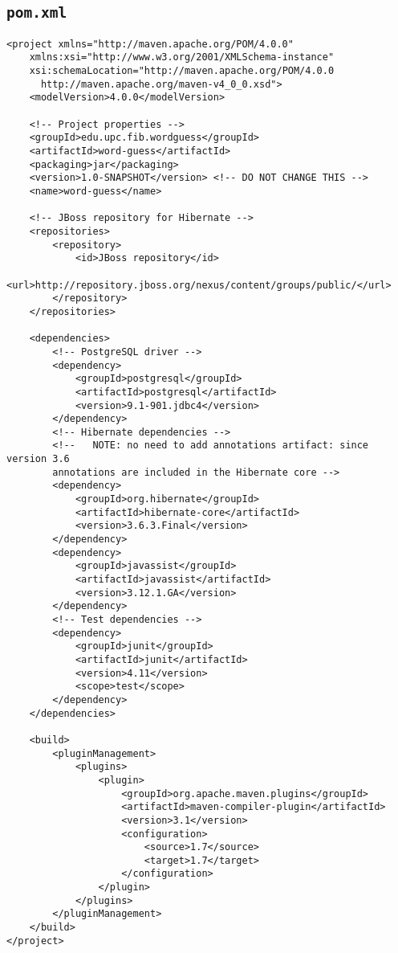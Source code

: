 \subsection{\texttt{pom.xml}}
\begin{verbatim}
<project xmlns="http://maven.apache.org/POM/4.0.0" 
    xmlns:xsi="http://www.w3.org/2001/XMLSchema-instance"
    xsi:schemaLocation="http://maven.apache.org/POM/4.0.0 
      http://maven.apache.org/maven-v4_0_0.xsd">
    <modelVersion>4.0.0</modelVersion>

    <!-- Project properties -->
    <groupId>edu.upc.fib.wordguess</groupId>
    <artifactId>word-guess</artifactId>
    <packaging>jar</packaging>
    <version>1.0-SNAPSHOT</version> <!-- DO NOT CHANGE THIS -->
    <name>word-guess</name>

    <!-- JBoss repository for Hibernate -->
    <repositories>
        <repository>
            <id>JBoss repository</id>
            <url>http://repository.jboss.org/nexus/content/groups/public/</url>
        </repository>
    </repositories>

    <dependencies>
        <!-- PostgreSQL driver -->
        <dependency>
            <groupId>postgresql</groupId>
            <artifactId>postgresql</artifactId>
            <version>9.1-901.jdbc4</version>
        </dependency>
        <!-- Hibernate dependencies -->
        <!--   NOTE: no need to add annotations artifact: since version 3.6
        annotations are included in the Hibernate core -->
        <dependency>
            <groupId>org.hibernate</groupId>
            <artifactId>hibernate-core</artifactId>
            <version>3.6.3.Final</version>
        </dependency>
        <dependency>
            <groupId>javassist</groupId>
            <artifactId>javassist</artifactId>
            <version>3.12.1.GA</version>
        </dependency>
        <!-- Test dependencies -->
        <dependency>
            <groupId>junit</groupId>
            <artifactId>junit</artifactId>
            <version>4.11</version>
            <scope>test</scope>
        </dependency>
    </dependencies>

    <build>
        <pluginManagement>
            <plugins>
                <plugin>
                    <groupId>org.apache.maven.plugins</groupId>
                    <artifactId>maven-compiler-plugin</artifactId>
                    <version>3.1</version>
                    <configuration>
                        <source>1.7</source>
                        <target>1.7</target>
                    </configuration>
                </plugin>
            </plugins>
        </pluginManagement>
    </build>
</project>
\end{verbatim}